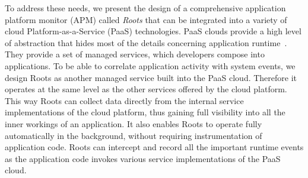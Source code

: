 To address these needs, we present the design of  a comprehensive application platform 
monitor (APM) called \textit{Roots} that can be integrated
into a variety of cloud Platform-as-a-Service (PaaS) technologies. 
PaaS clouds provide a high level of abstraction that hides most of the details concerning application
runtime~\cite{Soni:2014:CCB:2592737.2592741}. They provide a set of managed services, which developers compose into applications.
To be able to correlate application activity with system events,
we design Roots as another managed service built into the PaaS cloud. Therefore
it operates at the same level as the other services offered by the cloud platform. This way Roots can collect data
directly from the internal service implementations of the cloud platform, thus gaining full visibility into all the 
inner workings of an application. It also enables Roots to operate fully automatically in the background, without
requiring instrumentation of application code. Roots can intercept and record all the important runtime events as the
application code invokes various service implementations of the PaaS cloud.


